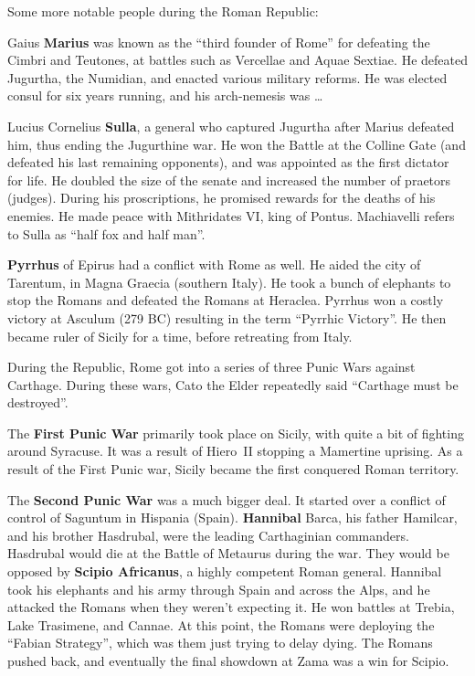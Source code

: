 Some more notable people during the Roman Republic:

Gaius \textbf{Marius} was known as the ``third founder of Rome'' for defeating the Cimbri and Teutones,
at battles such as Vercellae and Aquae Sextiae.
He defeated Jugurtha, the Numidian, and enacted various military reforms.
He was elected consul for six years running, and his arch-nemesis was \ldots

Lucius Cornelius \textbf{Sulla}, a general who captured Jugurtha after Marius defeated him,
thus ending the Jugurthine war.
He won the Battle at the Colline Gate (and defeated his last remaining opponents),
and was appointed as the first dictator for life.
He doubled the size of the senate and increased the number of praetors (judges).
During his proscriptions, he promised rewards for the deaths of his enemies.
He made peace with Mithridates VI, king of Pontus.
Machiavelli refers to Sulla as ``half fox and half man''.

\textbf{Pyrrhus} of Epirus had a conflict with Rome as well.
He aided the city of Tarentum, in Magna Graecia (southern Italy).
He took a bunch of elephants to stop the Romans and defeated the Romans at Heraclea.
Pyrrhus won a costly victory at Asculum (279 BC) resulting in the term ``Pyrrhic Victory''.
He then became ruler of Sicily for a time, before retreating from Italy.

During the Republic, Rome got into a series of three Punic Wars against Carthage.
During these wars, Cato the Elder repeatedly said ``Carthage must be destroyed''.

The \textbf{First Punic War} primarily took place on Sicily, with quite a bit of fighting around Syracuse.
It was a result of Hiero~II stopping a Mamertine uprising.
As a result of the First Punic war, Sicily became the first conquered Roman territory.

The \textbf{Second Punic War} was a much bigger deal.
It started over a conflict of control of Saguntum in Hispania (Spain).
\textbf{Hannibal} Barca, his father Hamilcar, and his brother Hasdrubal, were the leading Carthaginian commanders.
Hasdrubal would die at the Battle of Metaurus during the war.
They would be opposed by \textbf{Scipio Africanus}, a highly competent Roman general.
Hannibal took his elephants and his army through Spain and across the Alps,
and he attacked the Romans when they weren't expecting it.
He won battles at Trebia, Lake Trasimene, and Cannae.
At this point, the Romans were deploying the ``Fabian Strategy'', which was them just trying to delay dying.
The Romans pushed back, and eventually the final showdown at Zama was a win for Scipio.

